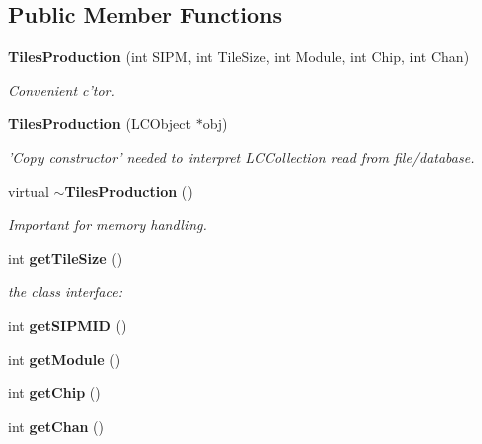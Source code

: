 \subsection*{Public Member Functions}
\begin{DoxyCompactItemize}
\item 
{\bf Tiles\-Production} (int S\-I\-P\-M, int Tile\-Size, int Module, int Chip, int Chan)\label{classCALICE_1_1TilesProduction_aaae665726387c446a308232ed3243340}

\begin{DoxyCompactList}\small\item\em Convenient c'tor. \end{DoxyCompactList}\item 
{\bf Tiles\-Production} (L\-C\-Object $\ast$obj)\label{classCALICE_1_1TilesProduction_a24af53b6d0bc286ec0e4348a24fb461a}

\begin{DoxyCompactList}\small\item\em 'Copy constructor' needed to interpret L\-C\-Collection read from file/database. \end{DoxyCompactList}\item 
virtual {\bf $\sim$\-Tiles\-Production} ()\label{classCALICE_1_1TilesProduction_abc1f291e49c75e4c61920ed7f77cd2d6}

\begin{DoxyCompactList}\small\item\em Important for memory handling. \end{DoxyCompactList}\item 
int {\bf get\-Tile\-Size} ()\label{classCALICE_1_1TilesProduction_a9b0ce86037b8292cb5d51b453f25b065}

\begin{DoxyCompactList}\small\item\em the class interface\-: \end{DoxyCompactList}\item 
int {\bfseries get\-S\-I\-P\-M\-I\-D} ()\label{classCALICE_1_1TilesProduction_ab040f65159706d933c8b2d251782fa86}

\item 
int {\bfseries get\-Module} ()\label{classCALICE_1_1TilesProduction_a3dabeea49b7615deb2664aae17842d13}

\item 
int {\bfseries get\-Chip} ()\label{classCALICE_1_1TilesProduction_a37933d4fc27281b950049577a0f387ab}

\item 
int {\bfseries get\-Chan} ()\label{classCALICE_1_1TilesProduction_a5f3437ca70d5d1e2641cb750e3ece6a6}


\end{DoxyCompactItemize}

